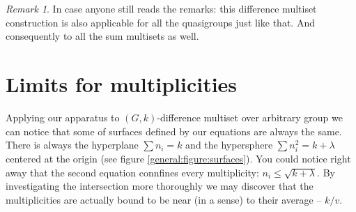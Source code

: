 \documentclass{article}
\theoremstyle{plain}
\theoremstyle{definition}
\theoremstyle{remark}
\newtheorem{remark}[theorem]{Remark}
\begin{document}
		\begin{remark}
			In case anyone still reads the remarks: this difference multiset construction is also applicable for all the quasigroups just like that. And consequently to all the sum multisets as well.
		\end{remark}
		
	\section{Limits for multiplicities}
		Applying our apparatus to $(G,k)$-difference multiset over arbitrary group we can notice that some of surfaces defined by our equations are always the same. There is always the hyperplane $\sum {n_i} = k$ and the hypersphere $\sum n_i^2 = k + \lambda$ centered at the origin (see figure \ref{general:figure:surfaces}). You could notice right away that the second equation connfines every multiplicity: $n_i \leq \sqrt{k+\lambda}$. By investigating the intersection more thoroughly we may discover that the multiplicities are actually bound to be near (in a sense) to their average -- $k/v$.
\end{document}
